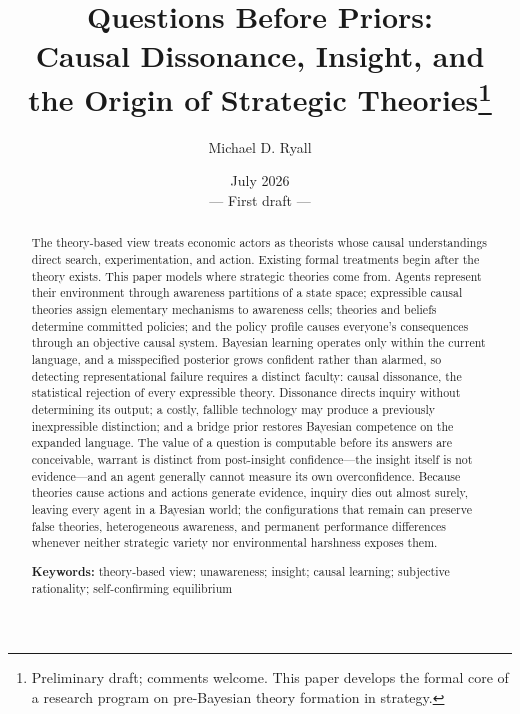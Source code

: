 \documentclass[11pt]{article}
\title{\textbf{Questions Before Priors:}\\
Causal Dissonance, Insight, and the Origin of Strategic Theories\thanks{%
Preliminary draft; comments welcome.  This paper develops the formal core of
a research program on pre-Bayesian theory formation in strategy.}}
\author{Michael D. Ryall}
\date{July 2026\\[0.4em]\normalsize --- First draft ---}
\theoremstyle{definition}
\begin{document}
\maketitle

\begin{abstract}
\noindent
The theory-based view treats economic actors as theorists whose causal
understandings direct search, experimentation, and action.  Existing formal
treatments begin after the theory exists.  This paper models where strategic
theories come from.  Agents represent their environment through awareness
partitions of a state space; expressible causal theories assign elementary
mechanisms to awareness cells; theories and beliefs determine committed
policies; and the policy profile causes everyone's consequences through an
objective causal system.  Bayesian learning operates only within the current
language, and a misspecified posterior grows confident rather than alarmed,
so detecting representational failure requires a distinct faculty: causal
dissonance, the statistical rejection of every expressible theory.
Dissonance directs inquiry without determining its output; a costly, fallible
technology may produce a previously inexpressible distinction; and a bridge
prior restores Bayesian competence on the expanded language.  The value of a
question is computable before its answers are conceivable, warrant is
distinct from post-insight confidence---the insight itself is not
evidence---and an agent generally cannot measure its own overconfidence.
Because theories cause actions and actions generate evidence, inquiry dies
out almost surely, leaving every agent in a Bayesian world; the
configurations that remain can preserve false theories, heterogeneous
awareness, and permanent performance differences whenever neither strategic
variety nor environmental harshness exposes them.
\medskip

\noindent\textbf{Keywords:} theory-based view; unawareness; insight; causal
learning; subjective rationality; self-confirming equilibrium
\end{abstract}

\newpage















\appendix

\end{document}
